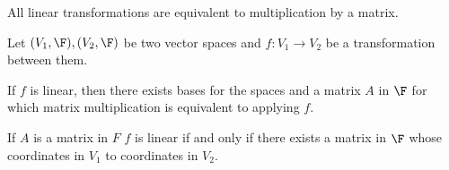 

All linear transformations are equivalent to multiplication by a matrix.


\begin{prop}

Let $(V_1, \F), (V_2, \F)$ be two vector spaces and $f: V_1 \to V_2$ be a transformation between them.

If $f$ is linear, then there exists bases for the spaces and a matrix $A$ in $\F$ for which matrix multiplication is equivalent to applying $f$.

If $A$ is a matrix in $F$ $f$ is linear if and only if there exists a matrix in $\F$ whose coordinates in $V_1$ to coordinates in $V_2$.

\end{prop}

\blankpage

